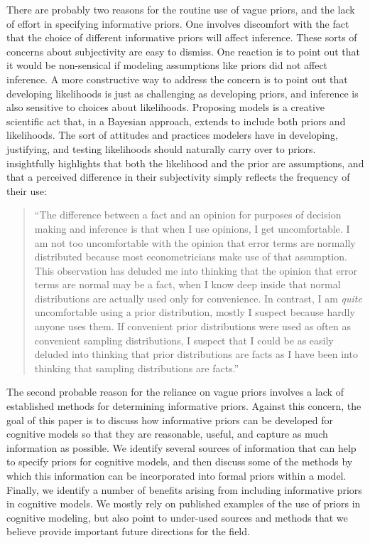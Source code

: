There are probably two reasons for the routine use of vague priors, and the lack of effort in specifying informative priors. One involves discomfort with the fact that the choice of different informative priors will affect inference. These sorts of concerns about subjectivity are easy to dismiss. One reaction is to point out that it would be non-sensical if modeling assumptions like priors did not affect inference. A more constructive way to address the concern is to point out that developing likelihoods is just as challenging as developing priors, and inference is also sensitive to choices about likelihoods. Proposing models is a creative scientific act that, in a Bayesian approach, extends to include both priors and likelihoods. The sort of attitudes and practices modelers have in developing, justifying, and testing likelihoods should naturally carry over to priors.  insightfully highlights that both the likelihood and the prior are assumptions, and that a perceived difference in their subjectivity simply reflects the frequency of their use:
\begin{quote}
``The difference between a fact and an opinion for purposes of decision making and inference is that when I use opinions, I get uncomfortable. I am not too uncomfortable with the opinion that error terms are normally distributed because most econometricians make use of that assumption. This observation has deluded me into thinking that the opinion that error terms are normal may be a fact, when I know deep inside that normal distributions are actually used only for convenience. In contrast, I am \emph{quite} uncomfortable using a prior distribution, mostly I suspect because hardly anyone uses them. If convenient prior distributions were used as often as convenient sampling distributions, I suspect that I could be as easily deluded into thinking that prior distributions are facts as I have been into thinking that sampling distributions are facts.''
\end{quote} 

The second probable reason for the reliance on vague priors involves a lack of established methods for determining informative priors. Against this concern, the goal of this paper is to discuss how informative priors can be developed for cognitive models so that they are reasonable, useful, and capture as much information as possible. We identify several sources of information that can help to specify priors for cognitive models, and then discuss some of the methods by which this information can be incorporated into formal priors within a model. Finally, we identify a number of benefits arising from including informative priors in cognitive models. We mostly rely on published examples of the use of priors in cognitive modeling, but also point to under-used sources and methods that we believe provide important future directions for the field.
  
